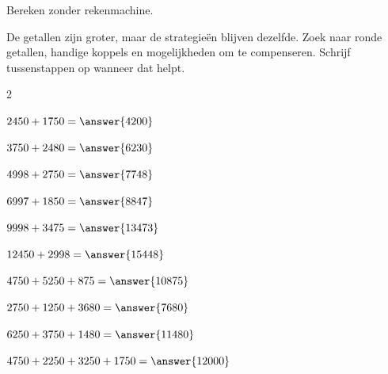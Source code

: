 \documentclass{ximera}
\begin{document}
    \begin{oefening}{\oefG}

        Bereken zonder rekenmachine.
        
        De getallen zijn groter, maar de strategieën blijven dezelfde.
        Zoek naar ronde getallen, handige koppels en mogelijkheden om te
        compenseren. Schrijf tussenstappen op wanneer dat helpt.
        
        \begin{multicols}{2}
        
        \begin{question}
        \(2450+1750=\answer{4200}\)
        \end{question}
        
        \begin{question}
        \(3750+2480=\answer{6230}\)
        \end{question}
        
        \begin{question}
        \(4998+2750=\answer{7748}\)
        \end{question}
        
        \begin{question}
        \(6997+1850=\answer{8847}\)
        \end{question}
        
        \begin{question}
        \(9998+3475=\answer{13473}\)
        \end{question}
        
        \begin{question}
        \(12450+2998=\answer{15448}\)
        \end{question}
        
        \begin{question}
        \(4750+5250+875=\answer{10875}\)
        \end{question}
        
        \begin{question}
        \(2750+1250+3680=\answer{7680}\)
        \end{question}
        
        \begin{question}
        \(6250+3750+1480=\answer{11480}\)
        \end{question}
        
        \begin{question}
        \(4750+2250+3250+1750=\answer{12000}\)
        \end{question}
        

\end{multicols}
\end{oefening}
\end{document}
